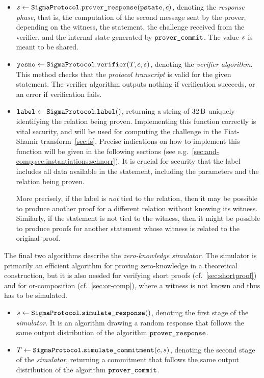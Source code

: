 \documentclass[11pt]{article}
\begin{document}
\begin{itemize}
        \item
          $s \gets \texttt{SigmaProtocol}.\texttt{prover\_response}(\texttt{pstate}, c)$,
          denoting the \emph{response phase}, that is, the computation of the second message sent by the prover, depending on the witness, the statement, the challenge received from the verifier, and the internal state generated by $\texttt{prover\_commit}$.
          The value $s$ is meant to be shared.
        \item $\texttt{yesno} \gets \texttt{SigmaProtocol}.\texttt{verifier}(T, c, s)$,
          denoting the \emph{verifier algorithm}. This method checks that
          the \emph{protocol transcript} is valid for the given statement.
          The verifier algorithm outputs nothing if verification succeeds,
          or an error if verification fails.
          \item $\texttt{label} \gets\texttt{SigmaProtocol}.\texttt{label}()$,
          returning a string of $\seedlen$ uniquely identifying the relation being proven.
          Implementing this function correctly is vital security, and will be used for computing the challenge in the Fiat-Shamir transform~\cref{sec:fs}.
          Precise indications on how to implement this function will be given in the following sections (see e.g.\ \cref{sec:and-comp,sec:instantiations:schnorr}).
          It is crucial for security that the label includes all data available in the statement, including the parameters and the relation being proven.

          More precisely, if the label is \emph{not} tied to the relation, then it may be possible to produce another proof for a different relation without knowing its witness.
          Similarly, if the statement is not tied to the witness, then it might be possible to produce proofs
          for another statement whose witness is related to the original proof.
      \end{itemize}
      The final two algorithms describe the \emph{zero-knowledge simulator}.
      The simulator is primarily an efficient algorithm for proving zero-knowledge in a theoretical construction, but it is also needed for verifying short proofs (cf.~\cref{sec:shortproof}) and for or-composition (cf.~\cref{sec:or-comp}), where a witness is not known and thus has to be simulated.
      \begin{itemize}
        \item $s \gets \texttt{SigmaProtocol}.\texttt{simulate\_response}()$,
        denoting the first stage of the \emph{simulator}. It is an algorithm drawing a random response that follows the same output distribution of the algorithm $\texttt{prover\_response}$.
        \item $T \gets \texttt{SigmaProtocol}.\texttt{simulate\_commitment}(c, s)$, denoting the second stage of the \emph{simulator}, returning a commitment that follows the same output distribution of the algorithm $\texttt{prover\_commit}$.
      \end{itemize}
\end{document}

